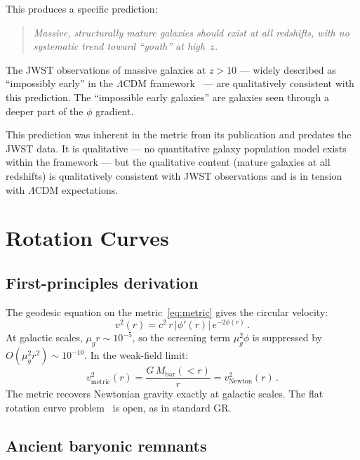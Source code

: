 \documentclass[aps,prd,twocolumn,superscriptaddress,nofootinbib,longbibliography]{revtex4-2}
\begin{document}
This produces a specific prediction:
\begin{quote}
\emph{Massive, structurally mature galaxies should exist at all
redshifts, with no systematic trend toward ``youth'' at high~$z$.}
\end{quote}
The JWST observations of massive galaxies at $z > 10$
--- widely described as ``impossibly early'' in the $\Lambda$CDM
framework~\cite{Labbe2023,Boylan2023,Carniani2024,Harikane2023} --- are qualitatively consistent with this
prediction.  The ``impossible early galaxies'' are galaxies seen
through a deeper part of the $\phi$ gradient.

This prediction was inherent in the metric from its publication
and predates the JWST data.  It is qualitative --- no quantitative
galaxy population model exists within the framework --- but the
qualitative content (mature galaxies at all redshifts) is
qualitatively consistent with JWST observations and is in tension
with $\Lambda$CDM expectations.

\section{Rotation Curves}\label{sec:rotcurves}

\subsection{First-principles derivation}

The geodesic equation on the metric~\eqref{eq:metric} gives the
circular velocity:
\begin{equation}\label{eq:vcirc}
  v^2(r) = c^2\,r\,|\phi'(r)|\,e^{-2\phi(r)}\,.
\end{equation}
At galactic scales, $\mu_g r \sim 10^{-5}$, so the screening term
$\mu_g^2\phi$ is suppressed by $O(\mu_g^2 r^2) \sim 10^{-10}$.  In
the weak-field limit:
\begin{equation}\label{eq:newt}
  v^2_{\mathrm{metric}}(r) = \frac{G\,M_{\mathrm{bar}}(<r)}{r}
  = v^2_{\mathrm{Newton}}(r)\,.
\end{equation}
The metric recovers Newtonian gravity exactly at galactic scales.
The flat rotation curve problem~\cite{Rubin1980,Milgrom1983} is open, as in standard GR.

\subsection{Ancient baryonic remnants}
\end{document}
